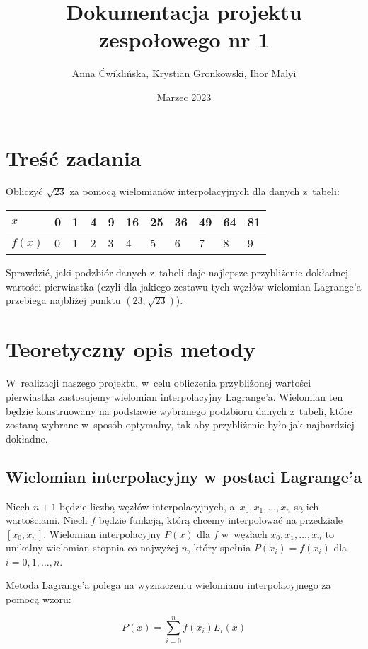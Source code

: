 \documentclass[12pt]{article}
\title{Dokumentacja projektu zespołowego nr 1}
\author{Anna Ćwiklińska, Krystian Gronkowski, Ihor Malyi}
\date{Marzec 2023}
\begin{document}
\maketitle

\section{Treść zadania}
Obliczyć $\sqrt{23}$ za pomocą wielomianów interpolacyjnych dla danych z~tabeli:

\begin{table}[h]
\centering
\begin{tabular}{l|llllllllll}
$x$    & 0 & 1 & 4 & 9 & 16 & 25 & 36 & 49 & 64 & 81 \\ \hline
$f(x)$ & 0 & 1 & 2 & 3 & 4  & 5  & 6  & 7  & 8  & 9  \\
\end{tabular}
\end{table}

Sprawdzić, jaki podzbiór danych z~tabeli daje najlepsze przybliżenie dokładnej wartości pierwiastka (czyli dla jakiego zestawu tych węzłów wielomian Lagrange’a przebiega najbliżej punktu $(23, \sqrt{23})$).

\section{Teoretyczny opis metody}
W~realizacji naszego projektu, w~celu obliczenia przybliżonej wartości pierwiastka zastosujemy wielomian interpolacyjny Lagrange'a. Wielomian ten będzie konstruowany na podstawie wybranego podzbioru danych z~tabeli, które zostaną wybrane w~sposób optymalny, tak aby przybliżenie było jak najbardziej dokładne.

\subsection{Wielomian interpolacyjny w postaci Lagrange'a}
Niech $n+1$ będzie liczbą węzłów interpolacyjnych, a~$x_0,x_1,\ldots,x_n$ są ich wartościami. Niech $f$ będzie funkcją, którą chcemy interpolować na przedziale $[x_0,x_n]$. Wielomian interpolacyjny $P(x)$ dla $f$ w~węzłach $x_0,x_1,\ldots,x_n$ to unikalny wielomian stopnia co najwyżej $n$, który spełnia $P(x_i) = f(x_i)$ dla $i=0,1,\ldots,n$.

Metoda Lagrange'a polega na wyznaczeniu wielomianu interpolacyjnego za pomocą wzoru:

\begin{equation*}
P(x) = \sum_{i=0}^{n} f(x_i) L_i(x)
\end{equation*}
\end{document}
